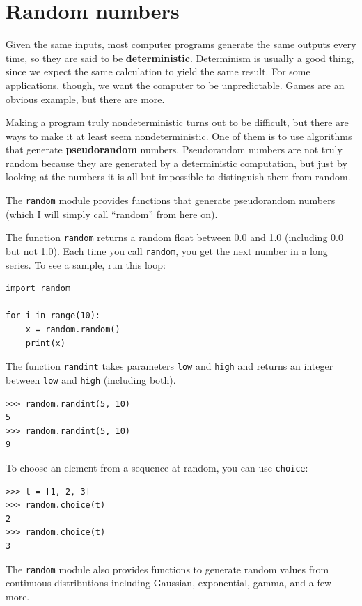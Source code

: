 \documentclass[10pt]{book}
\begin{document}
\section{Random numbers}

Given the same inputs, most computer programs generate the same
outputs every time, so they are said to be {\bf deterministic}.
Determinism is usually a good thing, since we expect the same
calculation to yield the same result.  For some applications, though,
we want the computer to be unpredictable.  Games are an obvious
example, but there are more.

Making a program truly nondeterministic turns out to be difficult,
but there are ways to make it at least seem nondeterministic.  One of
them is to use algorithms that generate {\bf pseudorandom} numbers.
Pseudorandom numbers are not truly random because they are generated
by a deterministic computation, but just by looking at the numbers it
is all but impossible to distinguish them from random.

The {\tt random} module provides functions that generate
pseudorandom numbers (which I will simply call ``random'' from
here on).

The function {\tt random} returns a random float
between 0.0 and 1.0 (including 0.0 but not 1.0).  Each time you
call {\tt random}, you get the next number in a long series.  To see a
sample, run this loop:

\begin{verbatim}
import random

for i in range(10):
    x = random.random()
    print(x)
\end{verbatim}
%
The function {\tt randint} takes parameters {\tt low} and
{\tt high} and returns an integer between {\tt low} and
{\tt high} (including both).

\begin{verbatim}
>>> random.randint(5, 10)
5
>>> random.randint(5, 10)
9
\end{verbatim}
%
To choose an element from a sequence at random, you can use
{\tt choice}:

\begin{verbatim}
>>> t = [1, 2, 3]
>>> random.choice(t)
2
>>> random.choice(t)
3
\end{verbatim}
%
The {\tt random} module also provides functions to generate
random values from continuous distributions including
Gaussian, exponential, gamma, and a few more.
\end{document}
